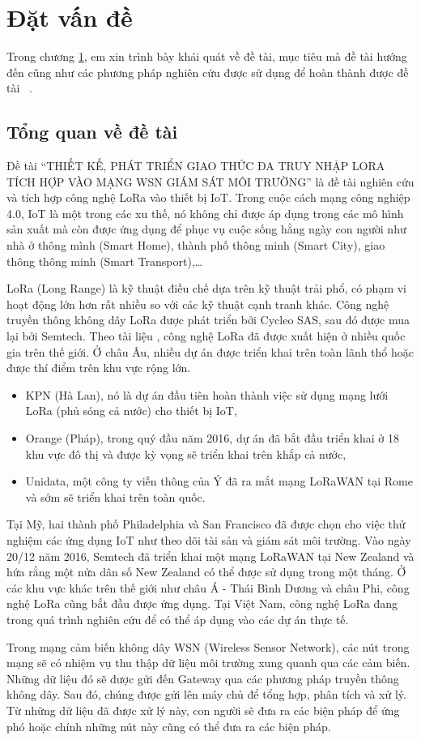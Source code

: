 \chapter{Đặt vấn đề}
\label{chapter1}
Trong chương \ref{chapter1}, em xin trình bày khái quát về đề tài, mục tiêu mà đề tài hướng đến cũng như các phương pháp nghiên cứu được sử dụng để hoàn thành được đề tài ~\cite{Bankov2017}.
\section{Tổng quan về đề tài}
Đề tài “THIẾT KẾ, PHÁT TRIỂN GIAO THỨC ĐA TRUY NHẬP LORA TÍCH HỢP VÀO MẠNG WSN GIÁM SÁT MÔI TRƯỜNG” là đề tài nghiên cứu và tích hợp công nghệ LoRa vào thiết bị IoT. Trong cuộc cách mạng công nghiệp 4.0, IoT là một trong các xu thế, nó không chỉ được áp dụng trong các mô hình sản xuất mà còn được ứng dụng để phục vụ cuộc sống hằng ngày con người như nhà ở thông mình (Smart Home), thành phố thông minh (Smart City), giao thông thông minh (Smart Transport),…
\par
LoRa (Long Range) là kỹ thuật điều chế dựa trên kỹ thuật trải phổ, có phạm vi hoạt động lớn hơn rất nhiều so với các kỹ thuật cạnh tranh khác. Công nghệ truyền thông không dây LoRa được phát triển bởi Cycleo SAS, sau đó được mua lại bởi Semtech. Theo tài liệu \cite{1}, công nghệ LoRa đã được xuất hiện ở nhiều quốc gia trên thế giới. Ở châu Âu, nhiều dự án được triển khai trên toàn lãnh thổ hoặc được thí điểm trên khu vực rộng lớn. 
\begin{itemize}
\item	KPN (Hà Lan), nó là dự án đầu tiên hoàn thành việc sử dụng mạng lưới LoRa (phủ sóng cả nước) cho thiết bị IoT,
\item	Orange (Pháp), trong quý đầu năm 2016, dự án đã bắt đầu triển khai ở 18 khu vực đô thị và được kỳ vọng sẽ triển khai trên khắp cả nước,
\item	Unidata, một công ty viễn thông của Ý đã ra mắt mạng LoRaWAN tại Rome và sớm sẽ triển khai trên toàn quốc.
\end{itemize}
Tại Mỹ, hai thành phố Philadelphia và San Francisco đã được chọn cho việc thử nghiệm các ứng dụng IoT như theo dõi tài sản và giám sát môi trường. Vào ngày 20/12 năm 2016, Semtech đã triển khai một mạng LoRaWAN tại New Zealand và hứa rằng một nửa dân số New Zealand có thể được sử dụng trong một tháng. Ở các khu vực khác trên thế giới như châu Á - Thái Bình Dương và châu Phi, công nghệ LoRa cũng bắt đầu được ứng dụng. Tại Việt Nam, công nghệ LoRa đang trong quá trình nghiên cứu để có thể áp dụng vào các dự án thực tế.
\par
Trong mạng cảm biến không dây WSN (Wireless Sensor Network), các nút trong mạng sẽ có nhiệm vụ thu thập dữ liệu môi trường xung quanh qua các cảm biến. Những dữ liệu đó sẽ được gửi đến Gateway qua các phương pháp truyền thông không dây. Sau đó, chúng được gửi lên máy chủ để tổng hợp, phân tích và xử lý. Từ những dữ liệu đã được xử lý này, con người sẽ đưa ra các biện pháp để ứng phó hoặc chính những nút này cũng có thể đưa ra các biện pháp.
